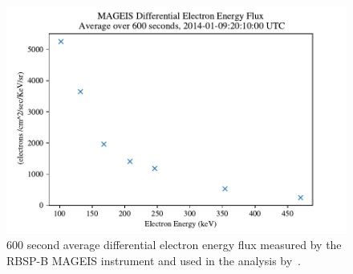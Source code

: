 \begin{figure}[p]
    \centering
    \includegraphics[width=1.0\textwidth]{figures/chapter_5/mageis_spectrum/mageis_spectrum}
    \caption{600 second average differential electron energy flux measured by the RBSP-B MAGEIS instrument and used in the analysis by~\cite{Halford2015}.}
    \label{mageis_spectrum}
\end{figure}




